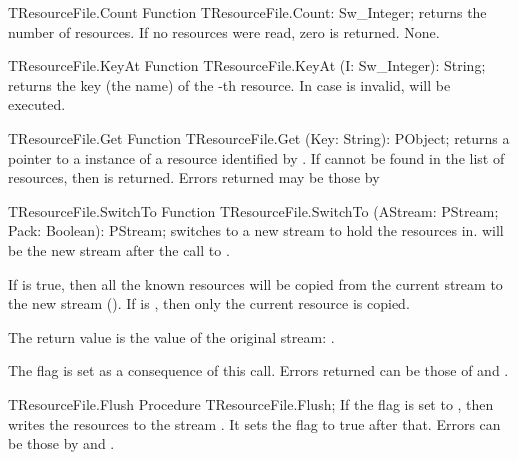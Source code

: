 \begin{function}{TResourceFile.Count}
\Declaration
Function TResourceFile.Count: Sw\_Integer;
\Description
{} returns the number of resources. If no resources were
read, zero is returned.
\Errors
None.
\SeeAlso
{}
\end{function}

\begin{function}{TResourceFile.KeyAt}
\Declaration
Function TResourceFile.KeyAt (I: Sw\_Integer): String;
\Description
{} returns the key (the name) of the -th resource.
\Errors
In case  is invalid,  will be executed.
\SeeAlso
{}
\end{function}

\begin{function}{TResourceFile.Get}
\Declaration
Function TResourceFile.Get (Key: String): PObject;
\Description
{} returns a pointer to a instance of a resource identified by
. If  cannot be found in the list of resources, then
 is returned.
\Errors
Errors returned may be those by 
\SeeAlso
\end{function}

\begin{function}{TResourceFile.SwitchTo}
\Declaration
Function TResourceFile.SwitchTo (AStream: PStream; Pack: Boolean): PStream;
\Description
{} switches to a new stream to hold the resources in.
 will be the new stream after the call to .

If  is true, then all the known resources will be copied from 
the current stream to the new stream (). If  is 
, then only the current resource is copied.

The return value is the value of the original stream: .

The  flag is set as a consequence of this call.
\Errors
Errors returned can be those of  and
.
\SeeAlso
{}
\end{function}

\begin{procedure}{TResourceFile.Flush}
\Declaration
Procedure TResourceFile.Flush;
\Description
If the  flag is set to , then  
writes the resources to the stream . It sets the 
flag to true after that.
\Errors
Errors can be those by  and .
\SeeAlso
{}
\end{procedure}

